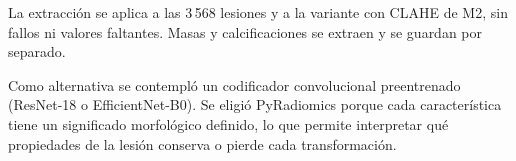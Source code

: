 La extracción se aplica a las 3\,568 lesiones y a la variante con CLAHE de M2, sin fallos ni
valores faltantes. Masas y calcificaciones se extraen y se guardan por separado.

Como alternativa se contempló un codificador convolucional preentrenado
(ResNet-18 o Efficient\-Net-B0). Se eligió PyRadiomics porque cada característica tiene un significado morfológico
definido, lo que permite interpretar qué propiedades de la lesión conserva o pierde cada
transformación.
